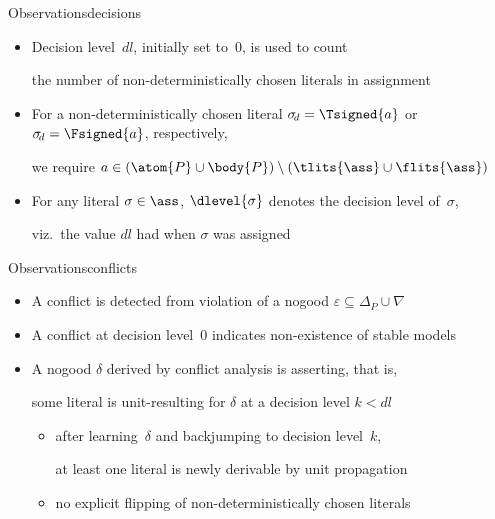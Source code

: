 \begin{frame}[shrink=20]%

\end{frame}
\begin{frame}{Observations}{decisions}
  \bigskip
  \begin{itemize}
  \item Decision level~$\mathit{dl}$, initially set to~$0$, is used to count
    \par
    the number of non-deterministically chosen literals in assignment~\ass
    \smallskip
  \item For a non-deterministically chosen literal
    $\sigma_{\!d}=\Tsigned{a}$ or $\sigma_{\!d}=\Fsigned{a}$,
    respectively,
    \par
    we require $a\in(\atom{P}\cup\body{P})\setminus(\tlits{\ass}\cup\flits{\ass})$
    \smallskip
  \item For any literal $\sigma\in\ass$,
    $\dlevel{\sigma}$ denotes the decision level of~$\sigma$,
    \par
    viz.\ the value $\mathit{dl}$ had when $\sigma$ was assigned
  \end{itemize}
\end{frame}
\begin{frame}{Observations}{conflicts}
  \bigskip
  \begin{itemize}
  \item A conflict is detected from violation of a nogood $\varepsilon\subseteq\Delta_P\cup\nabla$
    \smallskip
  \item A conflict at decision level~$0$%
    indicates non-existence of stable models
    \bigskip
  \item<3-> A nogood $\delta$ derived by conflict analysis is
    \alert{asserting}, that is,
    \par
    some literal is unit-resulting for $\delta$ at a decision level $k<\mathit{dl}$
    \begin{itemize}\normalsize
    \item<4-> after learning~$\delta$ and backjumping to decision level~$k$,

      at least one literal is newly derivable by unit propagation
      \smallskip
    \item<5-> no explicit flipping of non-deterministically chosen literals
    \end{itemize}
  \end{itemize}
\end{frame}
